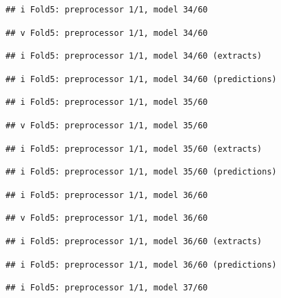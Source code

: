 \documentclass[
]{article}
\begin{document}
\begin{verbatim}
## i Fold5: preprocessor 1/1, model 34/60
\end{verbatim}

\begin{verbatim}
## v Fold5: preprocessor 1/1, model 34/60
\end{verbatim}

\begin{verbatim}
## i Fold5: preprocessor 1/1, model 34/60 (extracts)
\end{verbatim}

\begin{verbatim}
## i Fold5: preprocessor 1/1, model 34/60 (predictions)
\end{verbatim}

\begin{verbatim}
## i Fold5: preprocessor 1/1, model 35/60
\end{verbatim}

\begin{verbatim}
## v Fold5: preprocessor 1/1, model 35/60
\end{verbatim}

\begin{verbatim}
## i Fold5: preprocessor 1/1, model 35/60 (extracts)
\end{verbatim}

\begin{verbatim}
## i Fold5: preprocessor 1/1, model 35/60 (predictions)
\end{verbatim}

\begin{verbatim}
## i Fold5: preprocessor 1/1, model 36/60
\end{verbatim}

\begin{verbatim}
## v Fold5: preprocessor 1/1, model 36/60
\end{verbatim}

\begin{verbatim}
## i Fold5: preprocessor 1/1, model 36/60 (extracts)
\end{verbatim}

\begin{verbatim}
## i Fold5: preprocessor 1/1, model 36/60 (predictions)
\end{verbatim}

\begin{verbatim}
## i Fold5: preprocessor 1/1, model 37/60
\end{verbatim}
\end{document}
